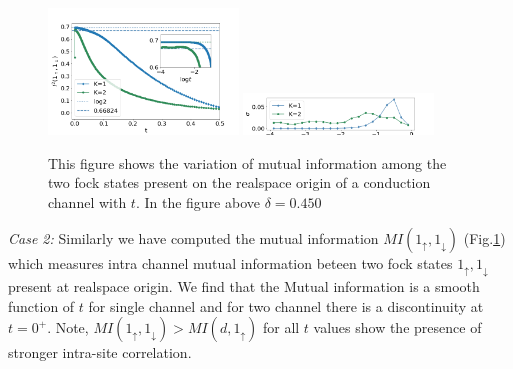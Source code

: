 \documentclass[reprint,prb,superscriptaddress]{revtex4-2}
\begin{document}
\begin{figure}[!htpb]
\includegraphics[width=0.45\textwidth]{plt/A_I2_ch12_['1_up','1_down']}
\includegraphics[width=0.45\textwidth]{plt/errorbar_A_I2_ch12_['1_up','1_down']}

\caption{This figure shows the variation of mutual information among the two fock states present on the realspace origin of a conduction channel with $t$. In the figure above $\delta=0.450$}
\label{fig:MI_1_2_vs_t_K}
\end{figure}

\par\textit{Case 2:} Similarly we have computed the mutual information $MI(1_{\uparrow},1_{\downarrow})$ (Fig.\ref{fig:MI_1_2_vs_t_K}) which measures intra channel  mutual information beteen two fock states $1_{\uparrow},1_{\downarrow}$ present at realspace origin. We find that the Mutual information is a smooth function of $t$ for single channel and for two channel there is a discontinuity at $t=0^{+}$. Note, $MI(1_{\uparrow},1_{\downarrow})>MI(d,1_{\uparrow})$ for all $t$ values show the presence of stronger intra-site correlation.
\end{document}
